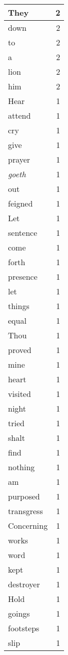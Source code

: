 \begin{center}
\begin{longtable}{l|r}
They & 2\\ \hline 
down & 2\\ \hline 
to & 2\\ \hline 
a & 2\\ \hline 
lion & 2\\ \hline 
him & 2\\ \hline 
Hear & 1\\ \hline 
attend & 1\\ \hline 
cry & 1\\ \hline 
give & 1\\ \hline 
prayer & 1\\ \hline 
\emph{goeth} & 1\\ \hline 
out & 1\\ \hline 
feigned & 1\\ \hline 
Let & 1\\ \hline 
sentence & 1\\ \hline 
come & 1\\ \hline 
forth & 1\\ \hline 
presence & 1\\ \hline 
let & 1\\ \hline 
things & 1\\ \hline 
equal & 1\\ \hline 
Thou & 1\\ \hline 
proved & 1\\ \hline 
mine & 1\\ \hline 
heart & 1\\ \hline 
visited & 1\\ \hline 
night & 1\\ \hline 
tried & 1\\ \hline 
shalt & 1\\ \hline 
find & 1\\ \hline 
nothing & 1\\ \hline 
am & 1\\ \hline 
purposed & 1\\ \hline 
transgress & 1\\ \hline 
Concerning & 1\\ \hline 
works & 1\\ \hline 
word & 1\\ \hline 
kept & 1\\ \hline 
destroyer & 1\\ \hline 
Hold & 1\\ \hline 
goings & 1\\ \hline 
footsteps & 1\\ \hline 
slip & 1\\ \hline 

\end{longtable}
\end{center}
